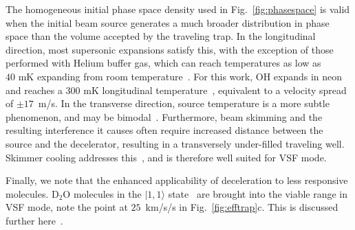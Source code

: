 \documentclass[%
 reprint,
 amsmath,amssymb,
 aps,
prl,
]{revtex4-1}
\begin{document}
The homogeneous initial phase space density used in Fig.~\ref{fig:phasespace} is valid when the initial beam source generates a much broader distribution in phase space than the volume accepted by the traveling trap.
In the longitudinal direction, most supersonic expansions satisfy this, with the exception of those performed with Helium buffer gas, which can reach temperatures as low as $40\text{ mK}$ expanding from room temperature~\cite{Even2014}.
For this work, OH expands in neon and reaches a $300\text{ mK}$ longitudinal temperature~\cite{Wu2018}, equivalent to a velocity spread of $\pm17$~m/s.
In the transverse direction, source temperature is a more subtle phenomenon, and may be bimodal~\cite{Beijerinck1981}.
Furthermore, beam skimming and the resulting interference it causes often require increased distance between the source and the decelerator, resulting in a transversely under-filled traveling well.
Skimmer cooling addresses this~\cite{Wu2018}, and is therefore well suited for VSF mode.

Finally, we note that the enhanced applicability of deceleration to less responsive molecules.
D$_2$O molecules in the $|1,1\rangle$ state~\cite{Motsch2009} are brought into the viable range in VSF mode, note the point at $25$~km/s/s in Fig.~\ref{fig:efftrap}c.
This is discussed further here~\cite{ssm}.

\end{document}
